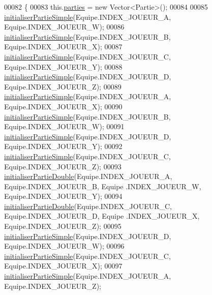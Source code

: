 \begin{DoxyCode}
00082     \{
00083         this.\hyperlink{classcom_1_1example_1_1area_1_1_rencontre_a9bdc6df389184fc2ecb4d87a7879213a}{parties} = \textcolor{keyword}{new} Vector<Partie>();
00084 
00085         \hyperlink{classcom_1_1example_1_1area_1_1_rencontre_afe8119a55e348caf296514d604718646}{initialiserPartieSimple}(Equipe.INDEX\_JOUEUR\_A, Equipe.INDEX\_JOUEUR\_W);
00086         \hyperlink{classcom_1_1example_1_1area_1_1_rencontre_afe8119a55e348caf296514d604718646}{initialiserPartieSimple}(Equipe.INDEX\_JOUEUR\_B, Equipe.INDEX\_JOUEUR\_X);
00087         \hyperlink{classcom_1_1example_1_1area_1_1_rencontre_afe8119a55e348caf296514d604718646}{initialiserPartieSimple}(Equipe.INDEX\_JOUEUR\_C, Equipe.INDEX\_JOUEUR\_Y);
00088         \hyperlink{classcom_1_1example_1_1area_1_1_rencontre_afe8119a55e348caf296514d604718646}{initialiserPartieSimple}(Equipe.INDEX\_JOUEUR\_D, Equipe.INDEX\_JOUEUR\_Z);
00089         \hyperlink{classcom_1_1example_1_1area_1_1_rencontre_afe8119a55e348caf296514d604718646}{initialiserPartieSimple}(Equipe.INDEX\_JOUEUR\_A, Equipe.INDEX\_JOUEUR\_X);
00090         \hyperlink{classcom_1_1example_1_1area_1_1_rencontre_afe8119a55e348caf296514d604718646}{initialiserPartieSimple}(Equipe.INDEX\_JOUEUR\_B, Equipe.INDEX\_JOUEUR\_W);
00091         \hyperlink{classcom_1_1example_1_1area_1_1_rencontre_afe8119a55e348caf296514d604718646}{initialiserPartieSimple}(Equipe.INDEX\_JOUEUR\_D, Equipe.INDEX\_JOUEUR\_Y);
00092         \hyperlink{classcom_1_1example_1_1area_1_1_rencontre_afe8119a55e348caf296514d604718646}{initialiserPartieSimple}(Equipe.INDEX\_JOUEUR\_C, Equipe.INDEX\_JOUEUR\_Z);
00093         \hyperlink{classcom_1_1example_1_1area_1_1_rencontre_a5dd70b0d58f74626bdb4bd21a21d661c}{initialiserPartieDouble}(Equipe.INDEX\_JOUEUR\_A, Equipe.INDEX\_JOUEUR\_B, Equipe
      .INDEX\_JOUEUR\_W, Equipe.INDEX\_JOUEUR\_Y);
00094         \hyperlink{classcom_1_1example_1_1area_1_1_rencontre_a5dd70b0d58f74626bdb4bd21a21d661c}{initialiserPartieDouble}(Equipe.INDEX\_JOUEUR\_C, Equipe.INDEX\_JOUEUR\_D, Equipe
      .INDEX\_JOUEUR\_X, Equipe.INDEX\_JOUEUR\_Z);
00095         \hyperlink{classcom_1_1example_1_1area_1_1_rencontre_afe8119a55e348caf296514d604718646}{initialiserPartieSimple}(Equipe.INDEX\_JOUEUR\_D, Equipe.INDEX\_JOUEUR\_W);
00096         \hyperlink{classcom_1_1example_1_1area_1_1_rencontre_afe8119a55e348caf296514d604718646}{initialiserPartieSimple}(Equipe.INDEX\_JOUEUR\_C, Equipe.INDEX\_JOUEUR\_X);
00097         \hyperlink{classcom_1_1example_1_1area_1_1_rencontre_afe8119a55e348caf296514d604718646}{initialiserPartieSimple}(Equipe.INDEX\_JOUEUR\_A, Equipe.INDEX\_JOUEUR\_Z);

\end{DoxyCode}
